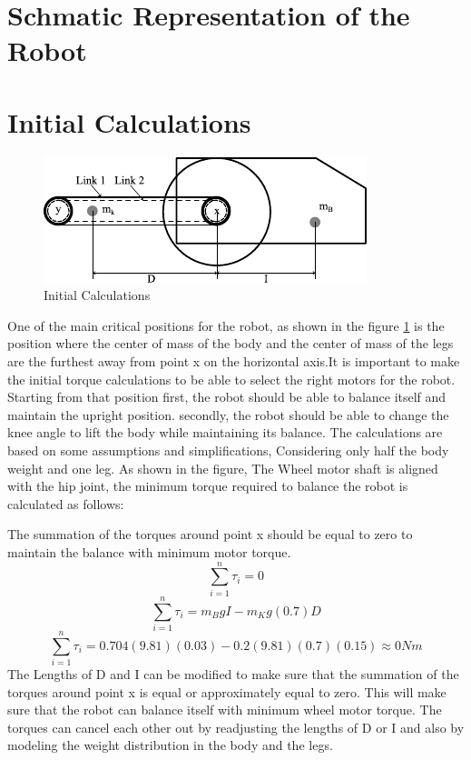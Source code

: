 \section{Schmatic Representation of the Robot}

\section{Initial Calculations}
\begin{figure}[h]
	\centering
	\includegraphics[width=0.7\linewidth]{Initial Calculations}
	\caption[Initial Calculations]{Initial Calculations}
	\label{fig:initialcalculations}
\end{figure}
One of the main critical positions for the robot, as shown in the figure \ref{fig:initialcalculations} is the position where the center of mass of the body and the center of mass of the legs are the furthest away from point x on the horizontal axis.It is important to make the initial torque calculations to be able to select the right motors for the robot.
Starting from that position first, the robot should be able to balance itself and maintain the upright position.
secondly, the robot should be able to change the knee angle to lift the body while maintaining its balance.
The calculations are based on some assumptions and simplifications, Considering only half the body weight and one leg.
As shown in the figure, The Wheel motor shaft is aligned with the hip joint, the minimum torque required to balance the robot is calculated as follows:

The summation of the torques around point x should be equal to zero to maintain the balance with minimum motor torque.
\begin{equation}
	\sum_{i=1}^{n} \tau_{i}=0
\end{equation}
\begin{equation}
	\sum_{i=1}^{n} \tau_{i}=m_{B}gI-m_{K}g(0.7)D
\end{equation}
\begin{equation}
	\sum_{i=1}^{n} \tau_{i}=0.704(9.81)(0.03)-0.2(9.81)(0.7)(0.15)\approx0 Nm
\end{equation}
The Lengths of D and I can be modified to make sure that the summation of the torques around point x is equal or approximately equal to zero.
This will make sure that the robot can balance itself with minimum wheel motor torque.
The torques can cancel each other out by readjusting the lengths of D or I and also by modeling the weight distribution in the body and the legs.

